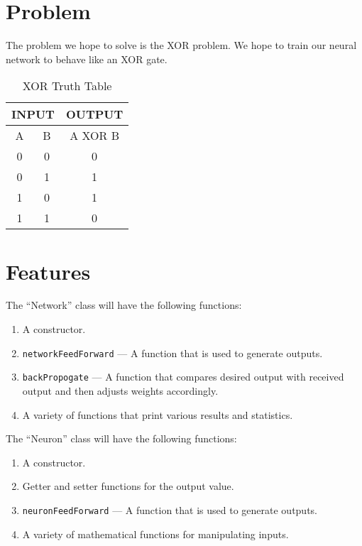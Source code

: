 \documentclass{article}
\begin{document}
\section{Problem}

The problem we hope to solve is the XOR problem. We hope to train our neural
network to behave like an XOR gate.

\begin{table}[h]
  \centering
    \begin{tabular}{|c|c|c|}
      \hline
      \multicolumn{2}{|c|}{\textbf{INPUT}} & \textbf{OUTPUT} \\ \hline
        A & B & A XOR B \\ \hline
        0 & 0 & 0 \\ \hline
        0 & 1 & 1 \\ \hline
        1 & 0 & 1 \\ \hline
        1 & 1 & 0 \\ \hline
    \end{tabular}
  \caption{XOR Truth Table}
\end{table}

\section{Features}

The ``Network'' class will have the following functions:
\begin{enumerate}
  \item
  A constructor.
  \item
  \verb!networkFeedForward! --- A function that is used to generate outputs.
  \item
  \verb!backPropogate! --- A function that compares desired output with
  received output and then adjusts weights accordingly.
  \item
  A variety of functions that print various results and statistics.
\end{enumerate}

The ``Neuron'' class will have the following functions:
\begin{enumerate}
  \item
  A constructor.
  \item
  Getter and setter functions for the output value.
  \item
  \verb!neuronFeedForward! --- A function that is used to generate outputs.
  \item
  A variety of mathematical functions for manipulating inputs.
\end{enumerate}
\end{document}
